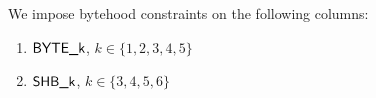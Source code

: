 We impose bytehood constraints on the following columns:
\begin{enumerate}
	\item $\textsf{BYTE}\textsf{\_k}$, $k\in\{1, 2, 3, 4, 5 \}$
	\item $\textsf{SHB\_k}$, $k\in\{3, 4, 5, 6 \}$
\end{enumerate}